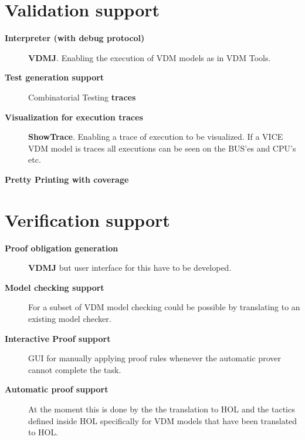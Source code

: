 \documentclass[11pt,a4paper,oneside]{report}
\begin{document}
\section{Validation support}
\begin{description}
	\item[\textbf{Interpreter (with debug protocol)}] \textbf{VDMJ}. Enabling the execution of VDM models as in VDM Tools.

	\item[\textbf{Test generation support}] Combinatorial Testing \textbf{traces}

	\item[\textbf{Visualization for execution traces}] \textbf{ShowTrace}. Enabling a trace of execution to be visualized. If a VICE VDM model is traces all executions can be seen on the BUS'es and CPU's etc.

	\item[\textbf{Pretty Printing with coverage}] 
\end{description}

\section{Verification support}
\begin{description}
	\item[\textbf{Proof obligation generation}] \textbf{VDMJ} but
          user interface for this have to be developed.
	\item[\textbf{Model checking support}] For a subset of VDM
          model checking could be possible by translating to an
          existing model checker. 

	\item[\textbf{Interactive Proof support}] GUI for manually
          applying proof rules whenever the automatic prover cannot
          complete the task.

	\item[\textbf{Automatic proof support}] At the moment this is
          done by the the translation to HOL and the tactics defined
          inside HOL specifically for VDM models that have been
          translated to HOL.

\end{description}
\end{document}
